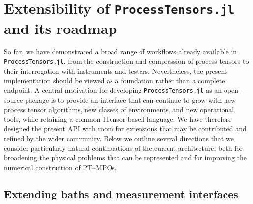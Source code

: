 \section{Extensibility of \texttt{ProcessTensors.jl} and its roadmap}
\label{sec:roadmap}

So far, we have demonstrated a broad range of workflows already available in \texttt{ProcessTensors.jl}, from the construction and compression of process tensors to their interrogation with instruments and testers.
Nevertheless, the present implementation should be viewed as a foundation rather than a complete endpoint.
A central motivation for developing \texttt{ProcessTensors.jl} as an open-source package is to provide an interface that can continue to grow with new process tensor algorithms, new classes of environments, and new operational tools, while retaining a common ITensor-based language.
We have therefore designed the present API with room for extensions that may be contributed and refined by the wider community.
Below we outline several directions that we consider particularly natural continuations of the current architecture, both for broadening the physical problems that can be represented and for improving the numerical construction of PT--MPOs.

\subsection{Extending baths and measurement interfaces}
\label{subsec:roadmap-baths-instruments}

